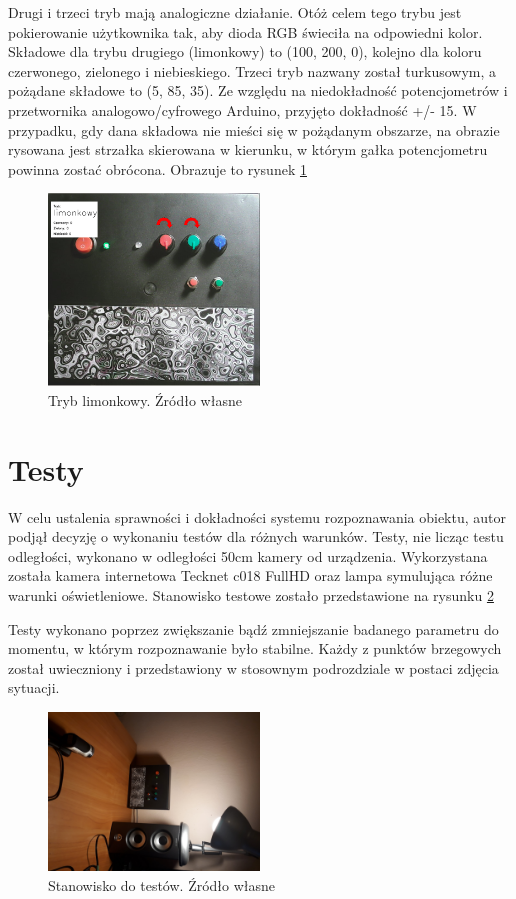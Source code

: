 \documentclass[12pt,twoside,polish]{article}
\begin{document}
Drugi i trzeci tryb mają analogiczne działanie. Otóż celem tego trybu jest pokierowanie użytkownika tak, aby dioda RGB świeciła na odpowiedni kolor. Składowe dla trybu drugiego (limonkowy) to (100, 200, 0), kolejno dla koloru czerwonego, zielonego i niebieskiego. Trzeci tryb nazwany został turkusowym, a pożądane składowe to (5, 85, 35). Ze względu na niedokładność potencjometrów i przetwornika analogowo/cyfrowego Arduino, przyjęto dokładność +/- 15. W przypadku, gdy dana składowa nie mieści się w pożądanym obszarze, na obrazie rysowana jest strzałka skierowana w kierunku, w którym gałka potencjometru powinna zostać obrócona. Obrazuje to rysunek \ref{limref}

\begin{figure}[h]
	\centering
	\includegraphics[width=0.5\textwidth]{lim}
	\caption{Tryb limonkowy. Źródło własne}
	\label{limref}
\end{figure}



\section{Testy}
W celu ustalenia sprawności i dokładności systemu rozpoznawania obiektu, autor podjął decyzję o wykonaniu testów dla różnych warunków. Testy, nie licząc testu odległości, wykonano w odległości 50cm kamery od urządzenia. Wykorzystana została kamera internetowa Tecknet c018 FullHD oraz lampa symulująca różne warunki oświetleniowe.  Stanowisko testowe zostało przedstawione na rysunku \ref{test_station}

Testy wykonano poprzez zwiększanie bądź zmniejszanie badanego parametru do momentu, w którym rozpoznawanie było stabilne. Każdy z punktów brzegowych został uwieczniony i przedstawiony w stosownym podrozdziale w postaci zdjęcia sytuacji.

\begin{figure}[h]
	\centering
	\includegraphics[width=0.5\textwidth]{test_stat}
	\caption{Stanowisko do testów. Źródło własne}
	\label{test_station}
\end{figure}
\end{document}
